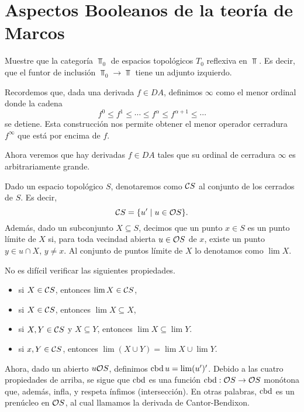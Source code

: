 \chapter{Aspectos Booleanos de la teoría de Marcos}


\begin{exe}
    Muestre que la categoría $\Top_0$ de espacios topológicos
    $T_0$ reflexiva en $\Top$.
    Es decir, que el funtor de inclusión $\Top_0\to\Top$
    tiene un adjunto izquierdo.
\end{exe}

Recordemos que, dada una derivada $f\in DA$,
definimos $\infty$ como el menor ordinal donde la cadena
\[
    f^0\leq f^1\leq \cdots\leq f^\alpha \leq f^{\alpha+1} \leq \cdots
\]
se detiene.
Esta construcción nos permite obtener
el menor operador cerradura $f^\infty$
que está por encima de $f$.

Ahora veremos que hay derivadas $f\in DA$ tales que
su ordinal de cerradura $\infty$ es arbitrariamente grande.

Dado un espacio topológico $S$,
denotaremos como $\cal CS$ al conjunto de los cerrados de $S$.
Es decir,
\[
    \cal CS = \{u'\mid u\in\cal OS\}
.\]
Además, dado un subconjunto $X\subseteq S$,
decimos que un punto $x\in S$ es un punto límite de $X$ si,
para toda vecindad abierta $u\in\cal OS$ de $x$,
existe un punto $y\in u\cap X$, $y\neq x$.
Al conjunto de puntos límite de $X$ lo denotamos como $\lim X$.

No es difícil verificar las siguientes propiedades.
\begin{itemize}
    \item si $X\in\cal CS$, entonces $\lim X\in\cal CS$,
    \item si $X\in\cal CS$, entonces $\lim X\subseteq X$,
    \item si $X,Y\in\cal CS$ y $X\subseteq Y$,
        entonces $\lim X\subseteq\lim Y$.
    \item si $x,Y\in\cal CS$,
        entonces $\lim(X\cup Y)=\lim X\cup\lim Y$.
\end{itemize}

Ahora, dado un abierto $u\cal OS$, definimos $\cbd u = \lim(u')'$.
Debido a las cuatro propiedades de arriba,
se sigue que $\cbd$ es una función $\cbd:\cal OS\to\cal OS$
monótona que, además, infla, y respeta ínfimos (intersección).
En otras palabras, $\cbd$ es un prenúcleo en $\cal OS$,
al cual llamamos la derivada de Cantor-Bendixon.

